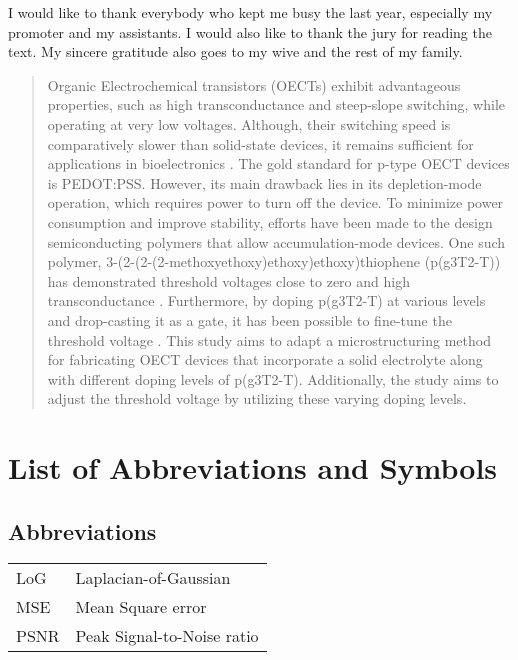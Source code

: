\documentclass[master=eelt,masteroption=ec]{kulemt}
\begin{document}
\begin{preface}
  I would like to thank everybody who kept me busy the last year,
  especially my promoter and my assistants. I would also like to thank the
  jury for reading the text. My sincere gratitude also goes to my wive and
  the rest of my family.
\end{preface}

\tableofcontents*

\begin{abstract}
Organic Electrochemical transistors (OECTs) exhibit advantageous properties, such as high transconductance and steep-slope switching, while operating at very low voltages. Although, their switching speed is comparatively slower than solid-state devices, it remains sufficient for applications in bioelectronics \cite{rivnay_organic_2018}. The gold standard for p-type OECT devices is PEDOT:PSS. However, its main drawback lies in its depletion-mode operation, which requires power to turn off the device. To minimize power consumption and improve stability, efforts have been made to the design semiconducting polymers that allow accumulation-mode devices. One such polymer, 3-(2-(2-(2-methoxyethoxy)ethoxy)ethoxy)thiophene (p(g3T2-T)) has demonstrated threshold voltages close to zero and high transconductance \cite{nielsen_molecular_2016}. Furthermore, by doping p(g3T2-T) at various levels and drop-casting it as a gate, it has been possible to fine-tune the threshold voltage \cite{tan_tuning_2022}. This study aims to adapt a microstructuring method for fabricating OECT devices that incorporate a solid electrolyte \cite{weissbach_photopatternable_2022} along with different doping levels of p(g3T2-T). Additionally, the study aims to adjust the threshold voltage by utilizing these varying doping levels.

\end{abstract}

\listoffiguresandtables
\chapter{List of Abbreviations and Symbols}
\section*{Abbreviations}
\begin{flushleft}
  \renewcommand{\arraystretch}{1.1}
  \begin{tabularx}{\textwidth}{@{}p{12mm}X@{}}
    LoG   & Laplacian-of-Gaussian \\
    MSE   & Mean Square error \\
    PSNR  & Peak Signal-to-Noise ratio \\
  \end{tabularx}
\end{flushleft}
\end{document}
